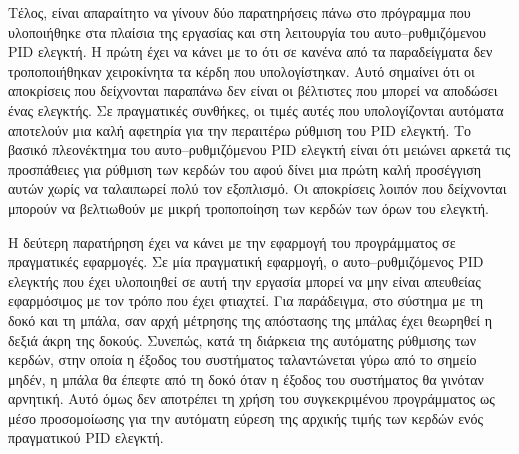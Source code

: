 Τέλος, είναι απαραίτητο να γίνουν δύο παρατηρήσεις πάνω στο πρόγραμμα που υλοποιήθηκε στα πλαίσια της εργασίας και στη λειτουργία του αυτο--ρυθμιζόμενου PID ελεγκτή. Η πρώτη έχει να κάνει με το ότι σε κανένα από τα παραδείγματα δεν τροποποιήθηκαν χειροκίνητα τα κέρδη που υπολογίστηκαν. Αυτό σημαίνει ότι οι αποκρίσεις που δείχνονται παραπάνω δεν είναι οι βέλτιστες που μπορεί να αποδώσει ένας ελεγκτής. Σε πραγματικές συνθήκες, οι τιμές αυτές που υπολογίζονται αυτόματα αποτελούν μια καλή αφετηρία για την περαιτέρω ρύθμιση του PID ελεγκτή. Το βασικό πλεονέκτημα του αυτο--ρυθμιζόμενου PID ελεγκτή είναι ότι μειώνει αρκετά τις προσπάθειες για ρύθμιση των κερδών του αφού δίνει μια πρώτη καλή προσέγγιση αυτών χωρίς να ταλαιπωρεί πολύ τον εξοπλισμό. Οι αποκρίσεις λοιπόν που δείχνονται μπορούν να βελτιωθούν με μικρή τροποποίηση των κερδών των όρων του ελεγκτή.

Η δεύτερη παρατήρηση έχει να κάνει με την εφαρμογή του προγράμματος σε πραγματικές εφαρμογές. Σε μία πραγματική εφαρμογή, ο αυτο--ρυθμιζόμενος PID ελεγκτής που έχει υλοποιηθεί σε αυτή την εργασία μπορεί να μην είναι απευθείας εφαρμόσιμος με τον τρόπο που έχει φτιαχτεί. Για παράδειγμα, στο σύστημα με τη δοκό και τη μπάλα, σαν αρχή μέτρησης της απόστασης της μπάλας έχει θεωρηθεί η δεξιά άκρη της δοκούς. Συνεπώς, κατά τη διάρκεια της αυτόματης ρύθμισης των κερδών, στην οποία η έξοδος του συστήματος ταλαντώνεται γύρω από το σημείο μηδέν, η μπάλα θα έπεφτε από τη δοκό όταν η έξοδος του συστήματος θα γινόταν αρνητική. Αυτό όμως δεν αποτρέπει τη χρήση του συγκεκριμένου προγράμματος ως μέσο προσομοίωσης για την αυτόματη εύρεση της αρχικής τιμής των κερδών ενός πραγματικού PID ελεγκτή. 







